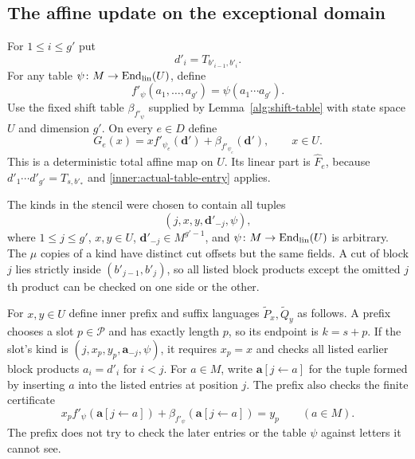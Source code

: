 \subsection{The affine update on the exceptional domain}

For $1\le i\le g'$ put
\[
                         d'_i=T_{b'_{i-1},b'_i}.
\]
For any table $\psi\colon M\to\operatorname{End}_{\rm lin}(U)$,
define
\begin{equation}
 f'_\psi(a_1,\ldots,a_{g'})=\psi(a_1\cdots a_{g'}).
 \label{inner:product-table}
\end{equation}
Use the fixed shift table $\beta_{f'_\psi}$ supplied by
Lemma~\ref{alg:shift-table} with state space $U$ and dimension
$g'$.  On every $e\in D$ define
\begin{equation}
 G_e(x)=x f'_{\psi_e}(\mathbf d')+
                       \beta_{f'_{\psi_e}}(\mathbf d'),
 \qquad x\in U.
 \label{inner:affine-update}
\end{equation}
This is a deterministic total affine map on $U$.  Its linear
part is $\widehat F_e$, because
$d'_1\cdots d'_{g'}=T_{s,b'_*}$ and
\eqref{inner:actual-table-entry} applies.

The kinds in the stencil were chosen to contain all tuples
\[
          (j,x,y,\mathbf d'_{-j},\psi),
\]
where $1\le j\le g'$, $x,y\in U$,
$\mathbf d'_{-j}\in M^{g'-1}$, and
$\psi\colon M\to\operatorname{End}_{\rm lin}(U)$ is arbitrary.
The $\mu$ copies of a kind have distinct cut offsets but the same
fields.  A cut of block $j$ lies strictly inside
$(b'_{j-1},b'_j)$, so all listed block products except the omitted
$j$th product can be checked on one side or the other.

For $x,y\in U$ define inner prefix and suffix languages
$\widetilde P_x,\widetilde Q_y$ as follows.
A prefix chooses a slot $p\in\mathcal P$ and has exactly length
$p$, so its endpoint is $k=s+p$.  If the slot's kind is
$(j,x_p,y_p,\mathbf a_{-j},\psi)$, it requires $x_p=x$ and
checks all listed earlier block products $a_i=d'_i$ for $i<j$.
For $a\in M$, write $\mathbf a[j\leftarrow a]$ for the tuple
formed by inserting $a$ into the listed entries at position $j$.
The prefix also checks the finite certificate
\begin{equation}
 x_p f'_\psi(\mathbf a[j\leftarrow a])
 +\beta_{f'_\psi}(\mathbf a[j\leftarrow a])
 =y_p\qquad(a\in M).
 \label{inner:certificate}
\end{equation}
The prefix does not try to check the later entries or the table
$\psi$ against letters it cannot see.


